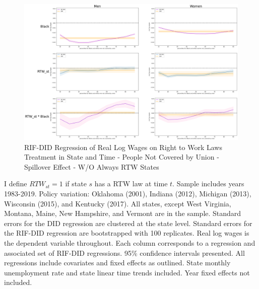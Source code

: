 \documentclass[11pt]{article}
\begin{document}
{\pagebreak
\begin{landscape}
\begin{figure}[ht!]
\centering
    \caption{RIF-DID Regression of Real Log Wages on Right to Work Laws Treatment in State and Time - People Not Covered by Union - Spillover Effect - W/O Always RTW States}\label{fig:rifdid-sltt-wo-ar2w-B}
    \includegraphics[width=1.25\textwidth, height = \textheight, keepaspectratio]{figures/fin_rifdid-sltt-wo-ar2w-B.png}
\end{figure}
\footnotesize{I define $RTW_{st} = 1$ if state $s$ has a RTW law at time $t$. Sample includes years 1983-2019. Policy variation: Oklahoma (2001), Indiana (2012), Michigan (2013), Wisconsin (2015), and Kentucky (2017). All states, except West Virginia, Montana, Maine, New Hampshire, and Vermont are in the sample. Standard errors for the DID regression are clustered at the state level. Standard errors for the RIF-DID regression are bootstrapped with 100 replicates. Real log wages is the dependent variable throughout. Each column corresponds to a regression and associated set of RIF-DID regressions. 95\% confidence intervals presented. All regressions include covariates and fixed effects as outlined. State monthly unemployment rate and state linear time trends included. Year fixed effects not included.}
\end{landscape}

}
\end{document}
